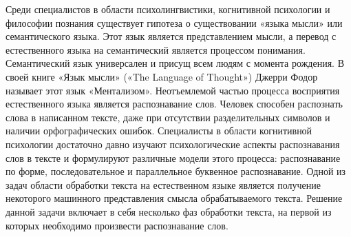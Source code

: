 Среди специалистов в области психолингвистики, когнитивной психологии и философии познания существует гипотеза о существовании  «языка мысли» или семантического языка. Этот язык является представлением мысли, а перевод с естественного языка на семантический является процессом понимания. Семантический язык универсален и присущ всем людям с момента рождения. В своей книге «Язык мысли» («The Language of Thought») Джерри Фодор называет этот язык «Ментализом». Неотъемлемой частью процесса восприятия естественного языка является распознавание слов. Человек способен распознать слова в написанном тексте, даже при отсутствии разделительных символов и наличии орфографических ошибок. Специалисты в области когнитивной психологии достаточно давно изучают психологические аспекты распознавания слов в тексте и формулируют различные модели этого процесса: распознавание по форме, последовательное и параллельное буквенное распознавание. 
Одной из задач области обработки текста на естественном языке является получение некоторого машинного представления смысла обрабатываемого текста. Решение данной задачи включает в себя несколько фаз обработки текста, на первой из которых необходимо произвести распознавание слов. 